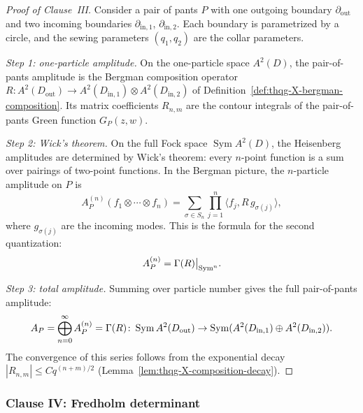 \begin{proof}[Proof of Clause~III]
Consider a pair of pants $P$ with one outgoing boundary $\partial_{\mathrm{out}}$
and two incoming boundaries $\partial_{\mathrm{in},1}$, $\partial_{\mathrm{in},2}$.
Each boundary is parametrized by a circle, and the sewing
parameters $(q_1, q_2)$ are the collar parameters.

\emph{Step 1: one-particle amplitude.}
On the one-particle space $A^2(D)$, the pair-of-pants amplitude
is the Bergman composition operator
$R \colon A^2(D_{\mathrm{out}}) \to
A^2(D_{\mathrm{in},1}) \otimes A^2(D_{\mathrm{in},2})$
of Definition~\ref{def:thqg-X-bergman-composition}.
Its matrix coefficients $R_{n,m}$ are the contour integrals
of the pair-of-pants Green function $G_P(z,w)$.

\emph{Step 2: Wick's theorem.}
On the full Fock space $\operatorname{Sym} A^2(D)$, the
Heisenberg amplitudes are determined by Wick's theorem:
every $n$-point function is a sum over pairings of two-point
functions. In the Bergman picture, the $n$-particle amplitude
on $P$ is
\begin{equation}\label{eq:thqg-X-wick-bergman}
A_P^{(n)}(f_1 \otimes \cdots \otimes f_n)
= \sum_{\sigma \in S_n}
\prod_{j=1}^{n}
\langle f_j, R\,g_{\sigma(j)}\rangle,
\end{equation}
where $g_{\sigma(j)}$ are the incoming modes. This is
the formula for the second quantization:
\[
A_P^{(n)}
= \Gamma(R)\big|_{\operatorname{Sym}^n}.
\]

\emph{Step 3: total amplitude.}
Summing over particle number gives the full pair-of-pants
amplitude:
\begin{equation}\label{eq:thqg-X-pants-second-quant}
A_P
= \bigoplus_{n=0}^{\infty}
A_P^{(n)}
= \Gamma(R)
\colon \operatorname{Sym} A^2(D_{\mathrm{out}})
\to
\operatorname{Sym}(A^2(D_{\mathrm{in},1})
\oplus A^2(D_{\mathrm{in},2})).
\end{equation}
The convergence of this series follows from the exponential
decay $|R_{n,m}| \leq C q^{(n+m)/2}$
(Lemma~\ref{lem:thqg-X-composition-decay}).
\end{proof}

\subsubsection{Clause IV: Fredholm determinant}


